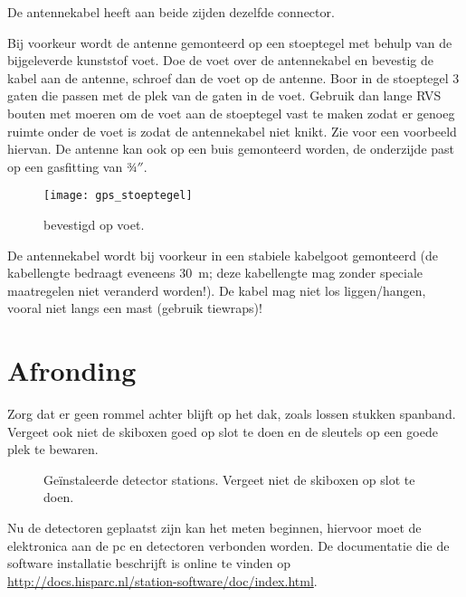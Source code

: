 De \gps antennekabel heeft aan beide zijden dezelfde connector.

Bij voorkeur wordt de \gps antenne gemonteerd op een stoeptegel met
behulp van de bijgeleverde kunststof voet. Doe de voet over de \gps
antennekabel en bevestig de kabel aan de \gps antenne, schroef dan de
voet op de \gps antenne. Boor in de stoeptegel 3 gaten die passen met de
plek van de gaten in de \gps voet. Gebruik dan lange RVS bouten met
moeren om de voet aan de stoeptegel vast te maken zodat er genoeg ruimte
onder de voet is zodat de antennekabel niet knikt. Zie
 voor een voorbeeld hiervan. De \gps antenne
kan ook op een buis gemonteerd worden, de onderzijde past op een
gasfitting van 3⁄4$''$.

\begin{figure}
    \centering
    \texttt{[image: gps\_stoeptegel]}
    \caption{\gps bevestigd op voet.}
    \label{fig:gps_stoeptegel}
\end{figure}

De \gps antennekabel wordt bij voorkeur in een stabiele kabelgoot
gemonteerd (de \gps kabellengte bedraagt eveneens \SI{30}{\meter}; deze
kabellengte mag zonder speciale maatregelen niet veranderd worden!). De
kabel mag niet los liggen/hangen, vooral niet langs een mast (gebruik
tiewraps)!


\section{Afronding}

Zorg dat er geen rommel achter blijft op het dak, zoals lossen stukken
spanband. Vergeet ook niet de skiboxen goed op slot te doen en de
sleutels op een goede plek te bewaren.

\begin{figure}
    \centering
    \caption{Geïnstaleerde detector stations. Vergeet niet de skiboxen
             op slot te doen.}
\end{figure}

Nu de detectoren geplaatst zijn kan het meten beginnen, hiervoor moet de
\hisparc elektronica aan de pc en detectoren verbonden worden. De
documentatie die de software installatie beschrijft is online te vinden
op \url{http://docs.hisparc.nl/station-software/doc/index.html}.




